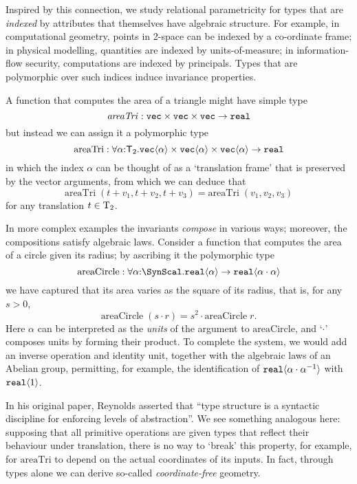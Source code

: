 Inspired by this connection, we study relational parametricity for
types that are \emph{indexed} by attributes that themselves have
algebraic structure.  For example, in computational geometry, points
in 2-space can be indexed by a co-ordinate frame; in physical
modelling, quantities are indexed by units-of-measure; in
information-flow security, computations are indexed by principals.
Types that are polymorphic over such indices induce invariance
properties.  

A function that computes the area of a triangle might
have simple type
\[
\mathit{areaTri} : \texttt{vec}\times\texttt{vec}\times\texttt{vec}\to\texttt{real}
\]
but instead we can assign it a polymorphic type
\[
\mathrm{areaTri} : \forall\alpha\mathord:\mathsf{T}_2.
  \textup{\texttt{vec}}\langle \alpha \rangle \times \textup{\texttt{vec}}\langle \alpha \rangle \times \textup{\texttt{vec}}\langle \alpha \rangle \to \texttt{real} \\
\]
in which the index $\alpha$ can be thought of as a `translation frame' that is
preserved by the vector arguments, from which we can deduce that
\[
\mathrm{areaTri}\;(t + v_1, t + v_2, t + v_3) = 
\mathrm{areaTri}\;(v_1, v_2, v_3)
\]
for any translation $t\in\mathrm{T}_2$.

In more complex examples the invariants \emph{compose} in various
ways; moreover, the compositions satisfy algebraic laws. Consider a function
that computes the area of a circle given its radius; by ascribing it
the polymorphic type
\[
\mathrm{areaCircle} : \forall\alpha\mathord:\SynScal.\tyPrim{real}{\alpha}\to
\tyPrim{real}{\alpha\cdot\alpha}
\]
we have captured that its area varies as the square of its radius, that is, for any $s>0$,
\[
\mathrm{areaCircle}\;(s\cdot r) = s^2\cdot \mathrm{areaCircle}\;r.
\]
Here $\alpha$ can be interpreted as the \emph{units} of the argument to
$\mathrm{areaCircle}$, and `$\cdot$' composes units by forming their
product. To complete the system, we would add an inverse operation and
identity unit, together with the algebraic laws of an Abelian group,
permitting, for example, the identification of
$\textup{\texttt{real}}\langle \alpha\cdot\alpha^{-1} \rangle$ with $\textup{\texttt{real}}\langle 1 \rangle$.

In his original paper, Reynolds asserted that ``type structure is a
syntactic discipline for enforcing levels of abstraction''. 
We see something analogous here: supposing that all primitive operations are
given types that reflect their behaviour under translation, there is no way
to `break' this property, for example, for $\mathrm{areaTri}$ to depend
on the actual coordinates of its inputs. In fact, through types alone we can
derive so-called \emph{coordinate-free} geometry. 

